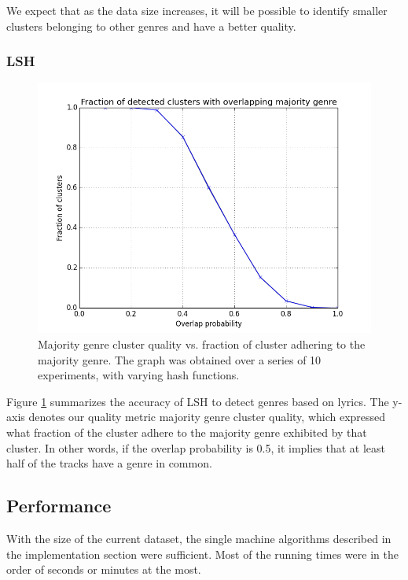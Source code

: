 \documentclass[10pt,a4paper]{scrartcl}
\begin{document}
	      We expect that as the data size increases, it will be possible to
	      identify smaller clusters belonging to other genres and have a better
	      quality.
      
      \subsubsection{LSH}
        \begin{figure}[htbp]
 	        \centering
	        \includegraphics[scale=0.5]{img/lsh_maj_prob.png}
 	        \caption{Majority genre cluster quality vs. fraction of cluster
 	                 adhering to the majority genre. The graph was obtained over 
 	                 a series of 10 experiments, with varying hash functions.}
	        \label{figure:lsh_res}
        \end{figure}
        
      Figure \ref{figure:lsh_res} summarizes the accuracy of LSH to detect
      genres based on lyrics.
      The y-axis denotes our quality metric majority genre cluster quality,
      which expressed what fraction of the cluster adhere to the majority
      genre exhibited by that cluster.
      In other words, if the overlap probability is 0.5, it implies that at
      least half of the tracks have a genre in common.

    \subsection{Performance}
      With the size of the current dataset, the single machine algorithms
      described in the implementation section were sufficient. Most of the
      running times were in the order of seconds or minutes at the most.
      
\end{document}
